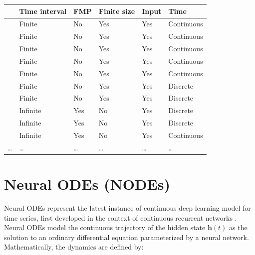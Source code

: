 \documentclass{article}
\theoremstyle{definition} \newtheorem{definition}{Definition}
\theoremstyle{remark} \newtheorem{remark}{Remark}
\newcounter{ct}
\begin{document}
\begin{table}[h]
\begin{tabular}{|l|l|l|l|l|l|}
\cline{2-6}
    \multicolumn{1}{c|}{}							%
 						&  Time interval & FMP	& Finite size 		&  Input     	&     Time   \\\cline{2-6}\hline
\citet{cybenko1989approximation} 	& Finite	& No 	& Yes 			&  Yes		&	Continuous\\\hline  %
\citet{funahashi1989approximate} 	& Finite	& No		& Yes			&  Yes		&	Continuous\\\hline  %
\citet{hornik1989multilayer} 		& Finite	& No 	& Yes			& Yes		&	Continuous\\\hline  %
\citet{funahashi1993approximation} 	& Finite	& No		& Yes			&  Yes		&	Continuous\\\hline
\citet{jin1995approximation}		& Finite	& No		& Yes			& Yes		&	Continuous	\\\hline
\citet{hammer2000approximation}	& Finite     & No 	& Yes			& Yes		& 	Discrete	\\\hline
\citet{jin1995universal}			& Finite	& No		& Yes			& Yes		&	Discrete	\\\hline
\citet{bai2019deq} 				& Infinite	& Yes	& No		 	& Yes 			&	Discrete		\\\hline
\citet{schafer2007uap} 			& Infinite 	& Yes	& No			& Yes 			&	Discrete\\\hline
\citet{wang2024state}			& Infinite   & Yes 	& No 		& Yes			& 	Continuous\\\hline %
\dots&\dots &\dots&\dots&\dots&\dots\\
\end{tabular}
\end{table}



\newpage
\section{Neural ODEs (NODEs)}
Neural ODEs \citep{chen2018neural} represent the latest instance of continuous deep learning model for time series, first developed in the context of continuous recurrent networks \citep{cohen1983absolute}.
%
Neural ODEs model the continuous trajectory of the hidden state \( \mathbf{h}(t) \) as the solution to an ordinary differential equation parameterized by a neural network. Mathematically, the dynamics are defined by:
\end{document}

